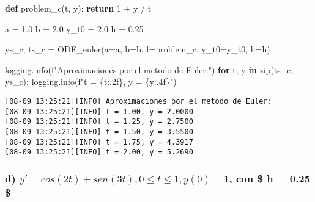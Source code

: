 \documentclass[
  letterpaper,
  DIV=11,
  numbers=noendperiod]{scrartcl}
\newenvironment{Shaded}{\begin{snugshade}}{\end{snugshade}}
\newcommand{\BuiltInTok}[1]{\textcolor[rgb]{0.00,0.23,0.31}{#1}}
\newcommand{\ControlFlowTok}[1]{\textcolor[rgb]{0.00,0.23,0.31}{\textbf{#1}}}
\newcommand{\DecValTok}[1]{\textcolor[rgb]{0.68,0.00,0.00}{#1}}
\newcommand{\FloatTok}[1]{\textcolor[rgb]{0.68,0.00,0.00}{#1}}
\newcommand{\KeywordTok}[1]{\textcolor[rgb]{0.00,0.23,0.31}{\textbf{#1}}}
\newcommand{\NormalTok}[1]{\textcolor[rgb]{0.00,0.23,0.31}{#1}}
\newcommand{\OperatorTok}[1]{\textcolor[rgb]{0.37,0.37,0.37}{#1}}
\newcommand{\SpecialCharTok}[1]{\textcolor[rgb]{0.37,0.37,0.37}{#1}}
\newcommand{\SpecialStringTok}[1]{\textcolor[rgb]{0.13,0.47,0.30}{#1}}
\begin{document}
\begin{Shaded}
\begin{Highlighting}[]

\KeywordTok{def}\NormalTok{ problem\_c(t, y):}
    \ControlFlowTok{return} \DecValTok{1} \OperatorTok{+}\NormalTok{ y }\OperatorTok{/}\NormalTok{ t}

\NormalTok{a }\OperatorTok{=} \FloatTok{1.0}  
\NormalTok{b }\OperatorTok{=} \FloatTok{2.0}  
\NormalTok{y\_t0 }\OperatorTok{=} \FloatTok{2.0}  
\NormalTok{h }\OperatorTok{=} \FloatTok{0.25}  

\NormalTok{ys\_c, ts\_c }\OperatorTok{=}\NormalTok{ ODE\_euler(a}\OperatorTok{=}\NormalTok{a, b}\OperatorTok{=}\NormalTok{b, f}\OperatorTok{=}\NormalTok{problem\_c, y\_t0}\OperatorTok{=}\NormalTok{y\_t0, h}\OperatorTok{=}\NormalTok{h)}

\NormalTok{logging.info(}\SpecialStringTok{f"Aproximaciones por el metodo de Euler:"}\NormalTok{)}
\ControlFlowTok{for}\NormalTok{ t, y }\KeywordTok{in} \BuiltInTok{zip}\NormalTok{(ts\_c, ys\_c):}
\NormalTok{    logging.info(}\SpecialStringTok{f"t = }\SpecialCharTok{\{}\NormalTok{t}\SpecialCharTok{:.2f\}}\SpecialStringTok{, y = }\SpecialCharTok{\{}\NormalTok{y}\SpecialCharTok{:.4f\}}\SpecialStringTok{"}\NormalTok{)}
\end{Highlighting}
\end{Shaded}

\begin{verbatim}
[08-09 13:25:21][INFO] Aproximaciones por el metodo de Euler:
[08-09 13:25:21][INFO] t = 1.00, y = 2.0000
[08-09 13:25:21][INFO] t = 1.25, y = 2.7500
[08-09 13:25:21][INFO] t = 1.50, y = 3.5500
[08-09 13:25:21][INFO] t = 1.75, y = 4.3917
[08-09 13:25:21][INFO] t = 2.00, y = 5.2690
\end{verbatim}

\subsubsection{\texorpdfstring{d)
\(y' = cos(2t)+sen(3t) , 0 \leq t \leq 1 ,  y(0) = 1\), con \$ h = 0.25
\$}{d) y\textquotesingle{} = cos(2t)+sen(3t) , 0 \textbackslash leq t \textbackslash leq 1 ,  y(0) = 1, con \$ h = 0.25 \$}}\label{d-y-cos2tsen3t-0-leq-t-leq-1-y0-1-con-h-0.25}
\end{document}
